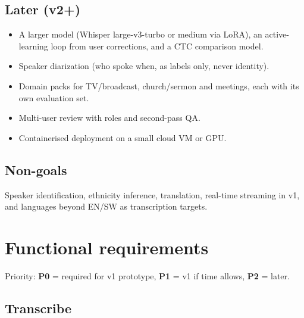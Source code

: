 \documentclass[11pt]{article}
\begin{document}
\hypertarget{later-v2}{%
\subsection{Later (v2+)}\label{later-v2}}

\begin{itemize}
\tightlist
\item
  A larger model (Whisper large-v3-turbo or medium via LoRA), an active-learning loop from user corrections, and a CTC comparison model.
\item
  Speaker diarization (who spoke when, as labels only, never identity).
\item
  Domain packs for TV/broadcast, church/sermon and meetings, each with its own evaluation set.
\item
  Multi-user review with roles and second-pass QA.
\item
  Containerised deployment on a small cloud VM or GPU.
\end{itemize}

\hypertarget{non-goals}{%
\subsection{Non-goals}\label{non-goals}}

Speaker identification, ethnicity inference, translation, real-time streaming in v1, and languages beyond EN/SW as transcription targets.

\hypertarget{functional-requirements}{%
\section{Functional requirements}\label{functional-requirements}}

Priority: \textbf{P0} = required for v1 prototype, \textbf{P1} = v1 if time allows, \textbf{P2} = later.

\hypertarget{transcribe}{%
\subsection{Transcribe}\label{transcribe}}
\end{document}
